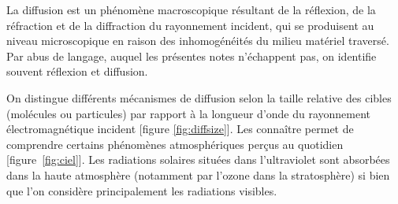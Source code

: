\sk
La diffusion est un phénomène macroscopique résultant de la réflexion, de la réfraction et de la diffraction du rayonnement incident, qui se produisent au niveau microscopique en raison des inhomogénéités du milieu matériel traversé. Par abus de langage, auquel les présentes notes n'échappent pas, on identifie souvent réflexion et diffusion. 

\sk
On distingue différents mécanismes de diffusion selon la taille relative des cibles (molécules ou particules) par rapport à la longueur d'onde du rayonnement électromagnétique incident [figure \ref{fig:diffsize}]. Les connaître permet de comprendre certains phénomènes atmosphériques perçus au quotidien [figure~\ref{fig:ciel}]. Les radiations solaires situées dans l'ultraviolet sont absorbées dans la haute atmosphère (notamment par l'ozone dans la stratosphère) si bien que l'on considère principalement les radiations visibles.
